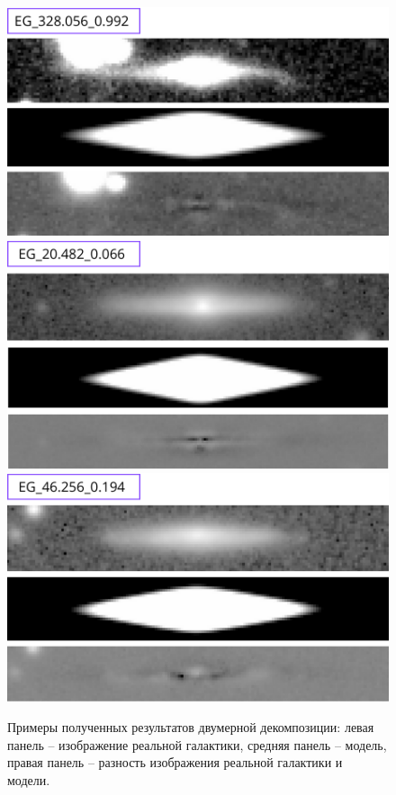 \begin{figure}[p]
    \centering
    \includegraphics[width=.7\textwidth]{plot_results/1.png}\hfill\\
    \includegraphics[width=.7\textwidth]{plot_results/2.png}\hfill\\
    \includegraphics[width=.7\textwidth]{plot_results/3.png}\hfill\\

    \caption{Примеры полученных результатов двумерной декомпозиции: левая панель -- изображение реальной галактики, средняя панель -- модель, правая панель -- разность изображения реальной галактики и модели.  }\label{fig:models}
\end{figure}